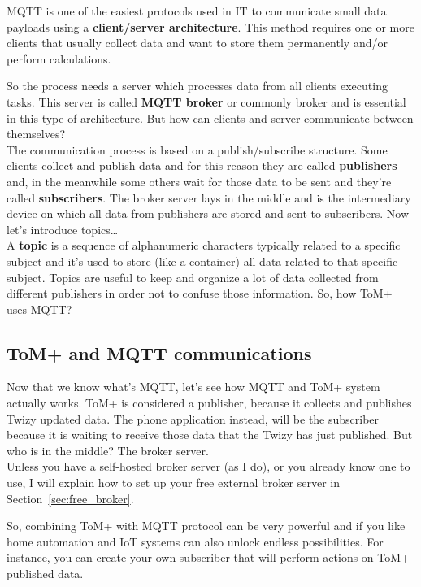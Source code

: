 MQTT is one of the easiest protocols used in IT to communicate small data payloads
using a \textbf{client/server architecture}. This method requires one or more clients that
usually collect data and want to store them permanently and/or perform calculations.


So the process needs a server which processes data from all clients executing tasks.
This server is called \textbf{MQTT broker} or commonly broker and is essential in this type
of architecture. But how can clients and server communicate between themselves?\\


The communication process is based on a publish/subscribe structure. Some clients
collect and publish data and for this reason they are called \textbf{publishers} and, in the
meanwhile some others wait for those data to be sent and they're called \textbf{subscribers}.
The broker server lays in the middle and is the intermediary device on which all data
from publishers are stored and sent to subscribers. Now let's introduce topics…\\


A \textbf{topic} is a sequence of alphanumeric characters typically related to a specific
subject and it's used to store (like a container) all data related to that specific
subject. Topics are useful to keep and organize a lot of data collected from different
publishers in order not to confuse those information. So, how ToM+ uses MQTT?

\subsection{ToM+ and MQTT communications}

Now that we know what's MQTT, let's see how MQTT and ToM+ system actually works.
ToM+ is considered a publisher, because it collects and publishes Twizy updated data.
The phone application instead, will be the subscriber because it is waiting to receive
those data that the Twizy has just published. But who is in the middle? The broker server.\\

Unless you have a self-hosted broker server (as I do), or you already know one to use, I
will explain how to set up your free external broker server in Section~\ref{sec:free_broker}.


So, combining ToM+ with MQTT protocol can be very powerful and if you like home
automation and IoT systems can also unlock endless possibilities. For instance, you can
create your own subscriber that will perform actions on ToM+ published data.\\


